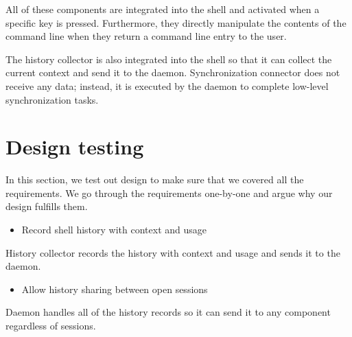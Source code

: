 All of these components are integrated into the shell and activated when a specific key is pressed. Furthermore, they directly manipulate the contents of the command line when they return a command line entry to the user.

The history collector is also integrated into the shell so that it can collect the current context and send it to the daemon. Synchronization connector does not receive any data; instead, it is executed by the daemon to complete low-level synchronization tasks. 

\section{Design testing}

In this section, we test out design to make sure that we covered all the requirements. We go through the requirements one-by-one and argue why our design fulfills them. 
\begin{itemize}
\item Record shell history with context and usage
\end{itemize}
History collector records the history with context and usage and sends it to the daemon.

\begin{itemize}
\item Allow history sharing between open sessions
\end{itemize}
Daemon handles all of the history records so it can send it to any component regardless of sessions.

